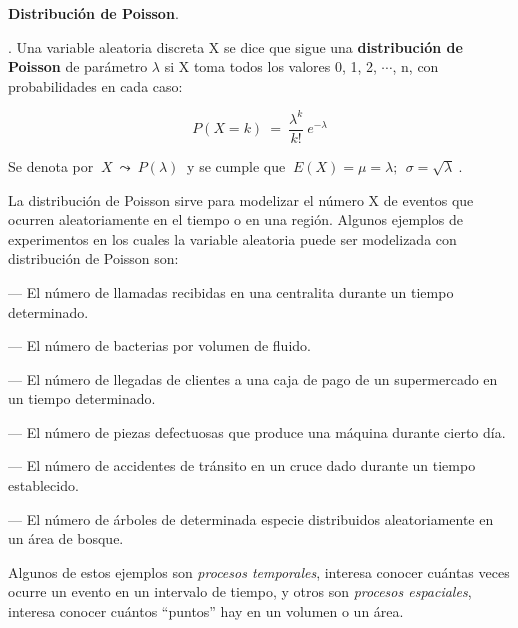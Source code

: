 \vspace{10mm} 

\textbf{\large{Distribución de Poisson}}\normalsize{.}

\begin{definition}
.	Una variable aleatoria discreta X se dice que sigue una \textbf{distribución de Poisson} de parámetro $\lambda$ si X toma todos los valores 0, 1, 2, $\cdots$, n, con probabilidades en cada caso:

$$P(X=k)\ = \ \dfrac{\lambda^k}{k!}\ e^{-\lambda}$$	

Se denota por $\ X \ \leadsto \ P(\lambda) \ $ y se cumple que $\ E(X)=\mu=\lambda;\ \ \sigma=\sqrt{\lambda} \ $. 
\end{definition}

\vspace{4mm}La distribución de Poisson sirve para modelizar el número X de eventos que ocurren aleatoriamente en el tiempo o en una región. Algunos ejemplos de experimentos en los cuales la variable aleatoria puede ser modelizada con distribución de Poisson son:

--- El número de llamadas recibidas en una centralita durante un tiempo determinado.

--- El número de bacterias por volumen de fluido.

--- El número de llegadas de clientes a una caja de pago de un supermercado en un tiempo determinado. 

--- El número de piezas defectuosas que produce una máquina durante cierto día.

--- El número de accidentes de tránsito en un cruce dado durante un tiempo establecido.

--- El número de árboles de determinada especie distribuidos aleatoriamente en un  área de bosque.

Algunos de estos ejemplos son \emph{procesos temporales}, interesa conocer cuántas veces ocurre un evento en un intervalo de tiempo, y otros son \emph{procesos espaciales}, interesa conocer cuántos “puntos” hay en un volumen o un área.

